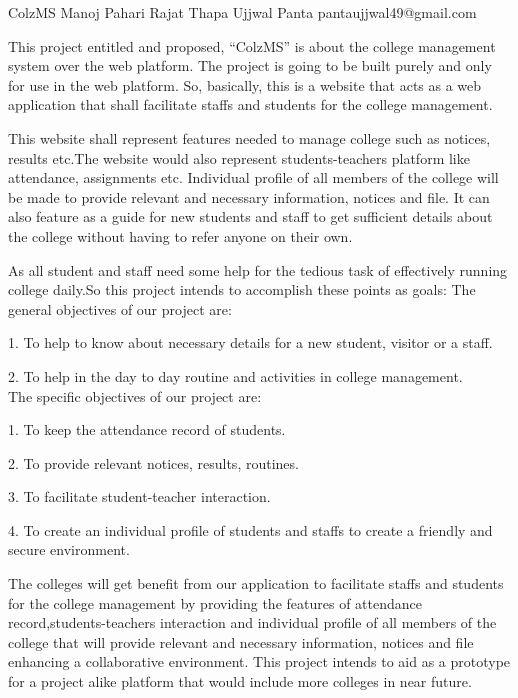  \begin{conf-abstract}[]
 {ColzMS}
 {Manoj Pahari
 Rajat Thapa
 Ujjwal Panta
 }
{pantaujjwal49@gmail.com}

This project entitled and proposed, “ColzMS” is about the college management system over the web platform. The project is going to be built purely and only for use in the web platform. So, basically, this is a website that acts as a web application that shall facilitate staffs and students for the college management.

This website shall represent features needed to manage college such as notices, results etc.The website would also represent students-teachers platform like attendance, assignments etc. Individual profile of all members of the college will be made to provide relevant and necessary information, notices and file. It can also feature as a guide for new students and staff to get sufficient details about the college without having to refer anyone on their own.

As all student and staff need some help for the tedious task of effectively running college daily.So this project intends to accomplish these points as goals:
The general objectives of our project are:

1.    To help to know about necessary details for a new student, visitor or a staff.

2.    To help in the day to day routine and activities in college management.
\\
The specific objectives of our project are: 

1.    To keep the attendance record of students.

2.    To provide relevant notices, results, routines.

3.    To facilitate student-teacher interaction.

4.    To create an individual profile of students and staffs to create a friendly and secure environment.

The colleges will get benefit from our application to facilitate staffs and students for the college management by providing the features of attendance record,students-teachers interaction and individual profile of all members of the college that will provide relevant and necessary information, notices and file enhancing a collaborative environment.
This project intends to aid as a prototype for a project alike platform that would include more colleges in near future.

 \end{conf-abstract}

